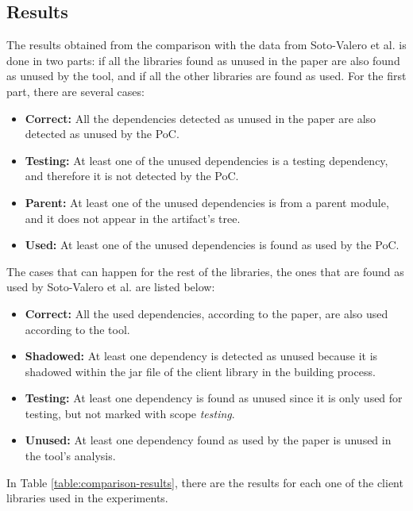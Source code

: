 \subsection{Results}

The results obtained from the comparison with the data from Soto-Valero et al. \cite{soto2020comprehensive} is done in two parts: if all the libraries found as unused in the paper are also found as unused by the tool, and if all the other libraries are found as used. For the first part, there are several cases:

\begin{itemize}
  \item \textbf{Correct:} All the dependencies detected as unused in the paper are also detected as unused by the PoC.
  \item \textbf{Testing:} At least one of the unused dependencies is a testing dependency, and therefore it is not detected by the PoC.
  \item \textbf{Parent:} At least one of the unused dependencies is from a parent module, and it does not appear in the artifact's tree.
  \item \textbf{Used:} At least one of the unused dependencies is found as used by the PoC.
\end{itemize}

The cases that can happen for the rest of the libraries, the ones that are found as used by Soto-Valero et al. are listed below:

\begin{itemize}
  \item \textbf{Correct:} All the used dependencies, according to the paper, are also used according to the tool.
  \item \textbf{Shadowed:} At least one dependency is detected as unused because it is shadowed within the jar file of the client library in the building process.
  \item \textbf{Testing:} At least one dependency is found as unused since it is only used for testing, but not marked with scope \textit{testing}.
  \item \textbf{Unused:} At least one dependency found as used by the paper is unused in the tool's analysis.
\end{itemize}

In Table \ref{table:comparison-results}, there are the results for each one of the client libraries used in the experiments.

